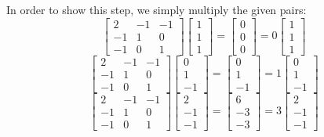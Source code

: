 \documentclass[16 pt]{amsart}
\theoremstyle{definition}
\theoremstyle{remark}
\numberwithin{equation}{subsection}
\begin{document}
In order to show this step, we simply multiply the given pairs:
\[
\begin{bmatrix}
2 & -1 & -1 \\
-1 & 1 & 0\\
-1 & 0 & 1
\end{bmatrix}  
\begin{bmatrix}
1\\1\\1
\end{bmatrix} = \begin{bmatrix}
0 \\ 0 \\ 0
\end{bmatrix} = 0\begin{bmatrix}
1\\1\\1
\end{bmatrix}
\]
\[
\begin{bmatrix}
2 & -1 & -1 \\
-1 & 1 & 0\\
-1 & 0 & 1
\end{bmatrix}  
\begin{bmatrix}
0\\1\\-1
\end{bmatrix} = \begin{bmatrix}
0 \\ 1 \\ -1
\end{bmatrix} = 1\begin{bmatrix}
0\\1\\-1
\end{bmatrix}
\]
\[
\begin{bmatrix}
2 & -1 & -1 \\
-1 & 1 & 0\\
-1 & 0 & 1
\end{bmatrix}  
\begin{bmatrix}
2\\-1\\-1
\end{bmatrix} = \begin{bmatrix}
6 \\ -3 \\ -3
\end{bmatrix} = 3\begin{bmatrix}
2\\-1\\-1
\end{bmatrix}
\]
\end{document}
